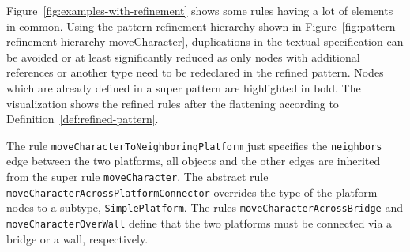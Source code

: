 \noindent
Figure~\ref{fig:examples-with-refinement} shows some rules having a lot of elements in common.
Using the pattern refinement hierarchy shown in Figure~\ref{fig:pattern-refinement-hierarchy-moveCharacter}, duplications in the textual specification can be avoided or at least significantly reduced as only nodes with additional references or another type need to be redeclared in the refined pattern.
Nodes which are already defined in a super pattern are highlighted in bold.
The visualization shows the refined rules after the flattening according to Definition~\ref{def:refined-pattern}.

The rule \texttt{moveCharacterToNeighboringPlatform} just specifies the \texttt{neighbors} edge between the two platforms, all objects and the other edges are inherited from the super rule \texttt{moveCharacter}.
The abstract rule \texttt{moveCharacterAcrossPlatformConnector} overrides the type of the platform nodes to a subtype, \texttt{SimplePlatform}.
The rules \texttt{moveCharacterAcrossBridge} and \texttt{moveCharacterOverWall} define that the two platforms must be connected via a bridge or a wall, respectively.

